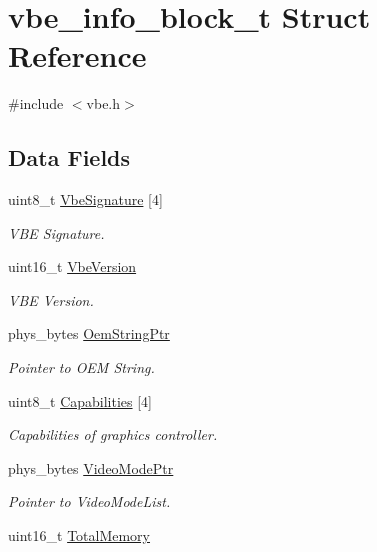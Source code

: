 \hypertarget{structvbe__info__block__t}{}\section{vbe\+\_\+info\+\_\+block\+\_\+t Struct Reference}
\label{structvbe__info__block__t}


{\ttfamily \#include $<$vbe.\+h$>$}

\subsection*{Data Fields}
\begin{DoxyCompactItemize}
\item 
uint8\+\_\+t \hyperlink{structvbe__info__block__t_ae619d4d52ca296b56a18c6ec13d4899d}{Vbe\+Signature} \mbox{[}4\mbox{]}
\begin{DoxyCompactList}\small\item\em V\+BE Signature. \end{DoxyCompactList}\item 
uint16\+\_\+t \hyperlink{structvbe__info__block__t_a7b9fef89774326b46f9481cbd9a397d3}{Vbe\+Version}
\begin{DoxyCompactList}\small\item\em V\+BE Version. \end{DoxyCompactList}\item 
phys\+\_\+bytes \hyperlink{structvbe__info__block__t_a20ab55e9dda8d437875255529c1cffe8}{Oem\+String\+Ptr}
\begin{DoxyCompactList}\small\item\em Pointer to O\+EM String. \end{DoxyCompactList}\item 
uint8\+\_\+t \hyperlink{structvbe__info__block__t_a555521aede0ff448231fc7a404862bdb}{Capabilities} \mbox{[}4\mbox{]}
\begin{DoxyCompactList}\small\item\em Capabilities of graphics controller. \end{DoxyCompactList}\item 
phys\+\_\+bytes \hyperlink{structvbe__info__block__t_a9d989fdbcdad6a40c10fc28c0f9af760}{Video\+Mode\+Ptr}
\begin{DoxyCompactList}\small\item\em Pointer to Video\+Mode\+List. \end{DoxyCompactList}\item 
uint16\+\_\+t \hyperlink{structvbe__info__block__t_a3e7b41e709394a10b3667e7f27f1aa7a}{Total\+Memory}

\end{DoxyCompactItemize}
